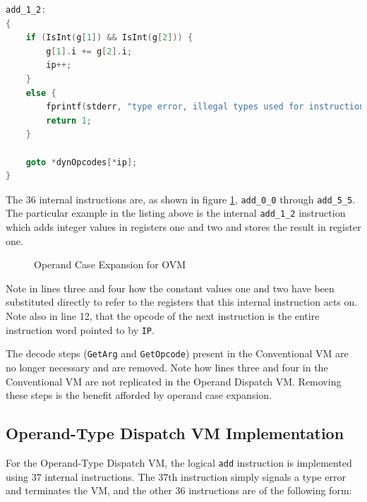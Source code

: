\documentclass[english,a4paper,12pt]{report}
\begin{document}
\begin{lstlisting}[language=C]
add_1_2:
{
    if (IsInt(g[1]) && IsInt(g[2])) {
        g[1].i += g[2].i;
        ip++;
    }
    else {
        fprintf(stderr, "type error, illegal types used for instruction: add");
        return 1;
    }

    goto *dynOpcodes[*ip];
}
\end{lstlisting}

The 36 internal instructions are, as shown in figure
\ref{fig:op-case-expansion-implementation}, \verb|add_0_0| through
\verb|add_5_5|. The particular example in the listing above is the
internal \verb|add_1_2| instruction which adds integer values in
registers one and two and stores the result in register one. 

\begin{figure}[!htb]
	\centering
	\caption{Operand Case Expansion for OVM}
	\label{fig:op-case-expansion-implementation}	
\end{figure}

Note in lines three and four how the constant values one and two have
been substituted directly to refer to the registers that this internal
instruction acts on.  Note also in line 12, that the opcode of the
next instruction is the entire instruction word pointed to by
\verb|IP|.

The decode steps (\verb|GetArg| and \verb|GetOpcode|) present in the
Conventional VM are no longer necessary and are removed. Note how
lines three and four in the Conventional VM are not replicated in the
Operand Dispatch VM. Removing these steps is the benefit afforded by
operand case expansion.

\subsection{Operand-Type Dispatch VM Implementation}
\label{sec:operand-type-dispatch-implementation}

For the Operand-Type Dispatch VM, the logical \verb|add| instruction
is implemented using 37 internal instructions. The 37th instruction
simply signals a type error and terminates the VM, and the other 36
instructions are of the following form:
\end{document}
